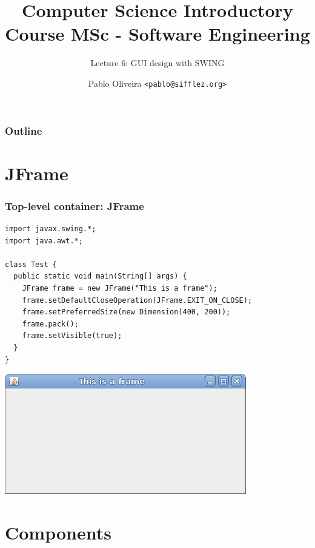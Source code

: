 \documentclass[10pt, handout]{beamer}
\title{Computer Science Introductory Course MSc - Software Engineering}
\subtitle{Lecture 6: GUI design with SWING}
\author[Pablo Oliveira]{Pablo Oliveira \texttt{<pablo@sifflez.org>}}
\institute{T\'el\'ecom ParisTech}
\date{}
\begin{document}
\begin{frame}
  \titlepage
\end{frame}

\begin{frame}
  \frametitle{Outline}
  \tableofcontents
\end{frame}

\section{JFrame}
\begin{frame}[fragile]
  \frametitle{Top-level container: JFrame}
  \begin{verbatim}
import javax.swing.*;
import java.awt.*;

class Test {
  public static void main(String[] args) {
    JFrame frame = new JFrame("This is a frame");
    frame.setDefaultCloseOperation(JFrame.EXIT_ON_CLOSE);
    frame.setPreferredSize(new Dimension(400, 200));
    frame.pack();
    frame.setVisible(true);
  }
}
\end{verbatim}
\begin{center}
\includegraphics[width=0.6\linewidth]{frame}
\end{center}
\end{frame}

\section{Components}
\end{document}
